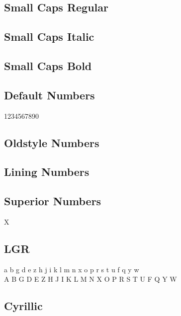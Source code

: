 \documentclass{article}
\begin{document}
\subsection*{Small Caps Regular}
\textsc{\lipsum[5]}

\subsection*{Small Caps Italic}
\textsc{\textit{\lipsum[6]}}

\subsection*{Small Caps Bold}
\textsc{\textbf{\lipsum[7]}}

\subsection*{Default Numbers}

1234567890

\subsection*{Oldstyle Numbers}

{}

\subsection*{Lining Numbers}

{}

\subsection*{Superior Numbers}

X

\subsection*{LGR}


{\ifxetex\else\ifluatex\else\libertinussanslgr\fi\fi
\noindent
 a b g d e z h j i k l m n x o p r s t u f q y w\\
 A B G D E Z H J I K L M N X O P R S T U F Q Y W\\
}

\subsection*{Cyrillic}
\end{document}
